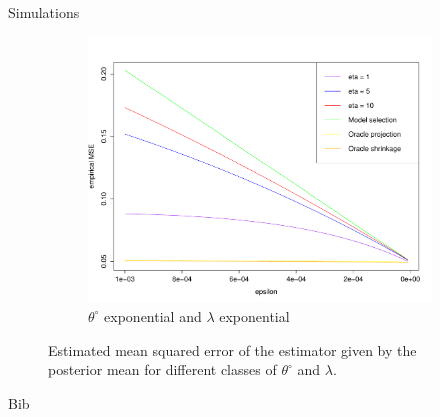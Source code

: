 \documentclass[10pt]{beamer}
\begin{document}
\begin{frame}{Simulations}
\begin{figure}
\begin{subfigure}{.5\textwidth}
  \label{fig3:sub3}
\end{subfigure}%
\begin{subfigure}{.5\textwidth}
  \centering
  \includegraphics[width=.5\linewidth]{EQM4}
  \caption{$\theta^{\circ}$ exponential and $\lambda$ exponential}
  \label{fig3:sub4}
\end{subfigure}
\caption{Estimated mean squared error of the estimator given by the posterior mean for different classes of $\theta^{\circ}$ and $\lambda$.}
\label{EQM}
\end{figure}
\end{frame}
\begin{frame}{Bib}
{}
\end{frame}

\end{document}
